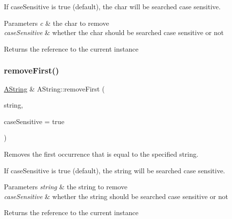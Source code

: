 If case\+Sensitive is true (default), the char will be searched case sensitive.


\begin{DoxyParams}{Parameters}
{\em c} & the char to remove \\
\hline
{\em case\+Sensitive} & whether the char should be searched case sensitive or not \\
\hline
\end{DoxyParams}
\begin{DoxyReturn}{Returns}
the reference to the current instance 
\end{DoxyReturn}
\mbox{\label{class_a_string_af7ef7985f65cfab4b67b5772717f7496}} 
\subsubsection{\texorpdfstring{removeFirst()}{removeFirst()}\hspace{0.1cm}{\footnotesize\ttfamily [2/2]}}
{\footnotesize\ttfamily \mbox{\hyperlink{class_a_string}{A\+String}} \& A\+String\+::remove\+First (\begin{DoxyParamCaption}\item[{const \mbox{\hyperlink{class_a_string}{A\+String}} \&}]{string,  }\item[{bool}]{case\+Sensitive = {\ttfamily true} }\end{DoxyParamCaption})}



Removes the first occurrence that is equal to the specified string. 

If case\+Sensitive is true (default), the string will be searched case sensitive.


\begin{DoxyParams}{Parameters}
{\em string} & the string to remove \\
\hline
{\em case\+Sensitive} & whether the string should be searched case sensitive or not \\
\hline
\end{DoxyParams}
\begin{DoxyReturn}{Returns}
the reference to the current instance 
\end{DoxyReturn}
\mbox{\label{class_a_string_a04bdc2e3cdfe637d2e5754227677eea1}} 
